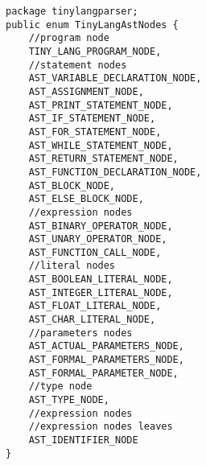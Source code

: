\begin{lstlisting}[basicstyle=\miniscule,caption=types associated with each node/subtree (\emph{enum TinyLangAstNodes}),label=listing:tiny lang node type implementation]
package tinylangparser;
public enum TinyLangAstNodes {
	//program node
	TINY_LANG_PROGRAM_NODE,
	//statement nodes
	AST_VARIABLE_DECLARATION_NODE,
	AST_ASSIGNMENT_NODE,
	AST_PRINT_STATEMENT_NODE,
	AST_IF_STATEMENT_NODE,
	AST_FOR_STATEMENT_NODE,
	AST_WHILE_STATEMENT_NODE,
	AST_RETURN_STATEMENT_NODE,
	AST_FUNCTION_DECLARATION_NODE,
	AST_BLOCK_NODE,
	AST_ELSE_BLOCK_NODE,	
	//expression nodes
	AST_BINARY_OPERATOR_NODE,
	AST_UNARY_OPERATOR_NODE,
	AST_FUNCTION_CALL_NODE,
	//literal nodes
	AST_BOOLEAN_LITERAL_NODE,
	AST_INTEGER_LITERAL_NODE,
	AST_FLOAT_LITERAL_NODE,
	AST_CHAR_LITERAL_NODE,
	//parameters nodes
	AST_ACTUAL_PARAMETERS_NODE,
	AST_FORMAL_PARAMETERS_NODE,
	AST_FORMAL_PARAMETER_NODE,
	//type node
	AST_TYPE_NODE,
	//expression nodes
	//expression nodes leaves
	AST_IDENTIFIER_NODE
}
\end{lstlisting}

